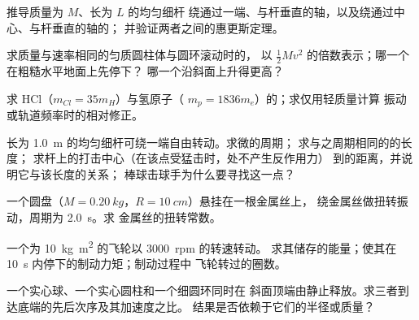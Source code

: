 \begin{exercise}[$\star$]\label{exo:b1:systems-of-points:4}
推导质量为 $M$、长为 $L$ 的均匀细杆
绕通过一端、与杆垂直的轴，以及绕通过中心、与杆垂直的轴的；
并验证两者之间的惠更斯定理。
\end{exercise}

\begin{exercise}[$\star\star$]\label{exo:b1:systems-of-points:5}
求质量与速率相同的匀质圆柱体与圆环滚动时的，
以 $\tfrac12 Mv^2$ 的倍数表示；哪一个在粗糙水平地面上先停下？
哪一个沿斜面上升得更高？
\end{exercise}

\begin{exercise}[$\star\star$]\label{exo:b1:systems-of-points:6}
求 HCl（$m_{Cl} = 35m_H$）与氢原子（
$m_p = 1836m_e$）的；求仅用轻质量计算
振动或轨道频率时的相对修正。
\end{exercise}

\begin{exercise}[$\star\star$]\label{exo:b1:systems-of-points:7}
长为 \qty{1.0}{m} 的均匀细杆可绕一端自由转动。求微的周期；
求与之周期相同的的长度；
求杆上的打击中心（在该点受猛击时，处不产生反作用力）
到的距离，并说明它与该长度的关系；
棒球击球手为什么要寻找这一点？
\end{exercise}

\begin{exercise}[$\star\star$]\label{exo:b1:systems-of-points:8}
一个圆盘（$M = \qty{0.20}{kg}$，$R = \qty{10}{cm}$）悬挂在一根金属丝上，
绕金属丝做扭转振动，周期为 \qty{2.0}{s}。求
金属丝的扭转常数。
\end{exercise}

\begin{exercise}[$\star\star$]\label{exo:b1:systems-of-points:9}
一个为 \qty{10}{kg.m^2} 的飞轮以 \qty{3000}{rpm} 的转速转动。
求其储存的能量；使其在 \qty{10}{s} 内停下的制动力矩；制动过程中
飞轮转过的圈数。
\end{exercise}

\begin{exercise}[$\star\star\star$]\label{exo:b1:systems-of-points:10}
一个实心球、一个实心圆柱和一个细圆环同时在
斜面顶端由静止释放。求三者到达底端的先后次序及其加速度之比。
结果是否依赖于它们的半径或质量？
\end{exercise}

